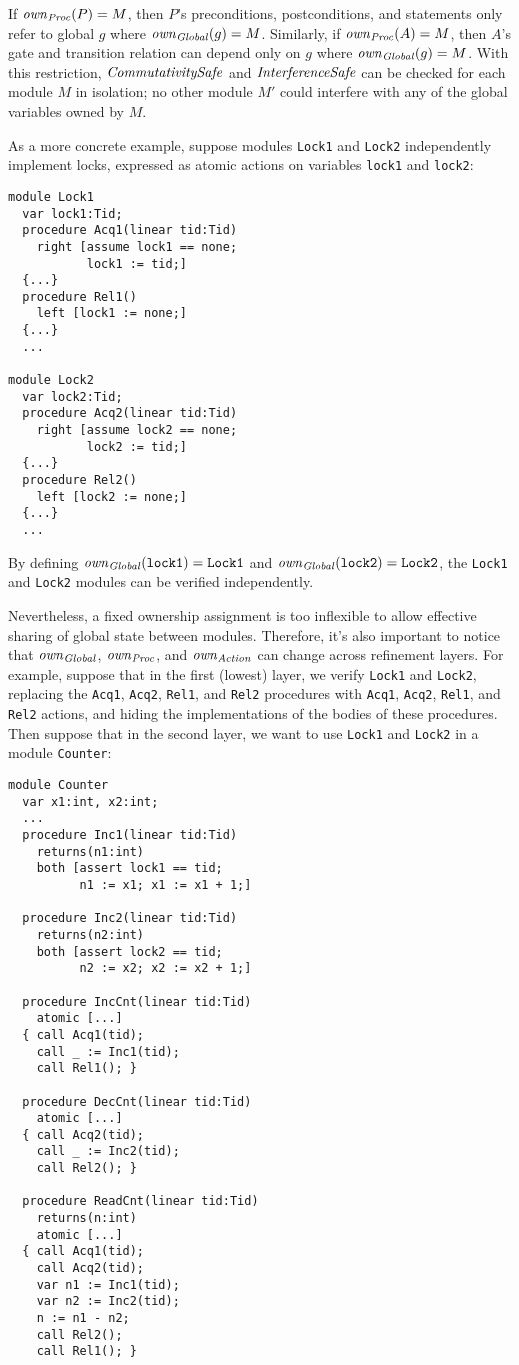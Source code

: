 \noindent
If $\mathit{own}_{\mathit{Proc}}(P) = M$, then $P$'s preconditions, postconditions, and statements only refer to global $g$ where $\mathit{own}_{\mathit{Global}}(g) = M$.
Similarly, if $\mathit{own}_{\mathit{Proc}}(A) = M$, then $A$'s gate and transition relation can depend only on $g$ where $\mathit{own}_{\mathit{Global}}(g) = M$.
With this restriction, $\mathit{CommutativitySafe}$ and $\mathit{InterferenceSafe}$ can be checked for each module $M$ in isolation;
no other module $M'$ could interfere with any of the global variables owned by $M$.

As a more concrete example, suppose modules \verb`Lock1` and \verb`Lock2` independently implement locks,
expressed as atomic actions on variables \verb`lock1` and \verb`lock2`:

\begin{verbatim}
module Lock1
  var lock1:Tid;
  procedure Acq1(linear tid:Tid)
    right [assume lock1 == none;
           lock1 := tid;]
  {...}
  procedure Rel1()
    left [lock1 := none;]
  {...}
  ...

module Lock2
  var lock2:Tid;
  procedure Acq2(linear tid:Tid)
    right [assume lock2 == none;
           lock2 := tid;]
  {...}
  procedure Rel2()
    left [lock2 := none;]
  {...}
  ...
\end{verbatim}

By defining $\mathit{own}_{\mathit{Global}}(\mathtt{lock1}) = \mathtt{Lock1}$ and $\mathit{own}_{\mathit{Global}}(\mathtt{lock2}) = \mathtt{Lock2}$,
the \verb`Lock1` and \verb`Lock2` modules can be verified independently.

Nevertheless, a fixed ownership assignment is too inflexible to allow effective sharing of global state between modules.
Therefore, it's also important to notice that $\mathit{own}_{\mathit{Global}}$, $\mathit{own}_{\mathit{Proc}}$, and $\mathit{own}_{\mathit{Action}}$ can change across refinement layers.
For example, suppose that in the first (lowest) layer,
we verify \verb`Lock1` and \verb`Lock2`,
replacing the \verb`Acq1`, \verb`Acq2`, \verb`Rel1`, and \verb`Rel2` procedures with \verb`Acq1`, \verb`Acq2`, \verb`Rel1`, and \verb`Rel2` actions,
and hiding the implementations of the bodies of these procedures.
Then suppose that in the second layer,
we want to use \verb`Lock1` and \verb`Lock2` in a module \verb`Counter`:

\begin{verbatim}
module Counter
  var x1:int, x2:int;
  ...
  procedure Inc1(linear tid:Tid)
    returns(n1:int)
    both [assert lock1 == tid;
          n1 := x1; x1 := x1 + 1;]

  procedure Inc2(linear tid:Tid)
    returns(n2:int)
    both [assert lock2 == tid;
          n2 := x2; x2 := x2 + 1;]

  procedure IncCnt(linear tid:Tid)
    atomic [...]
  { call Acq1(tid);
    call _ := Inc1(tid);
    call Rel1(); }

  procedure DecCnt(linear tid:Tid)
    atomic [...]
  { call Acq2(tid);
    call _ := Inc2(tid);
    call Rel2(); }

  procedure ReadCnt(linear tid:Tid)
    returns(n:int)
    atomic [...]
  { call Acq1(tid);
    call Acq2(tid);
    var n1 := Inc1(tid);
    var n2 := Inc2(tid);
    n := n1 - n2;
    call Rel2();
    call Rel1(); }
\end{verbatim}

